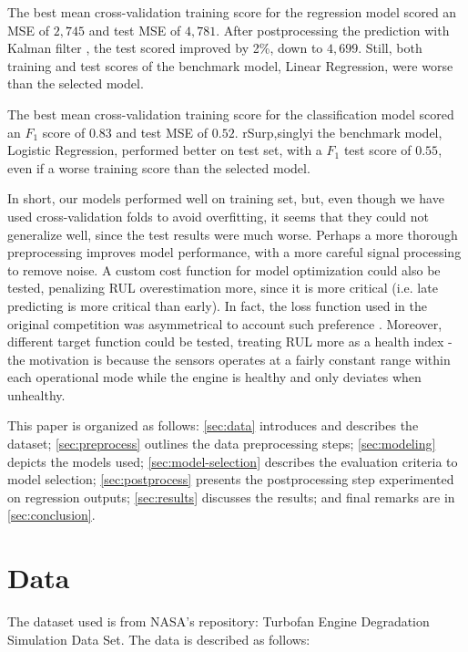 \documentclass[letterpaper, 10 pt, conference, onecolumn]{ieeeconf}  %
\begin{document}
The best mean cross-validation training score for the regression model scored an MSE of $2,745$ and test MSE of $4,781$. After postprocessing the prediction with Kalman filter \cite{h2oai}, the test scored improved by 2\%, down to $4,699$. Still, both training and test scores of the benchmark model, Linear Regression, were worse than the selected model.

The best mean cross-validation training score for the classification model scored an $F_1$ score of $0.83$ and test MSE of $0.52$. rSurp,singlyi the benchmark model, Logistic Regression, performed better on test set, with a $F_1$ test score of $0.55$, even if a worse training score than the selected model.

In short, our models performed well on training set, but, even though we have used cross-validation folds to avoid overfitting, it seems that they could not generalize well, since the test results were much worse. Perhaps a more thorough preprocessing improves model performance, with a more careful signal processing to remove noise. A custom cost function for model optimization could also be tested, penalizing RUL overestimation more, since it is more critical (i.e. late predicting is more critical than early). In fact, the loss function used in the original competition was asymmetrical to account such preference  \cite{saxena2008damage}. Moreover, different target function could be tested, treating RUL more as a health index - the motivation is because the sensors operates at a fairly constant range within each operational mode while the engine is healthy and only deviates when unhealthy.

This paper is organized as follows: \autoref{sec:data} introduces and describes the dataset; \autoref{sec:preprocess} outlines the data preprocessing steps; \autoref{sec:modeling} depicts the models used; \autoref{sec:model-selection} describes the evaluation criteria to model selection; \autoref{sec:postprocess} presents the postprocessing step experimented on regression outputs; \autoref{sec:results} discusses the results; and final remarks are in \autoref{sec:conclusion}.


\section{Data}\label{sec:data}
The dataset used is from NASA's repository: Turbofan Engine Degradation Simulation Data Set. The data is described as follows:
\end{document}
